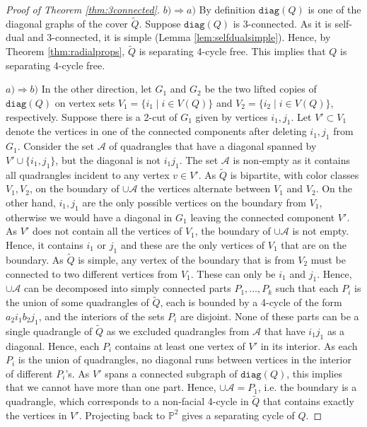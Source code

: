 \documentclass[10pt,a4paper]{article}
\newcommand{\Pb}[0]{\mathbb{P}}
\newcommand{\diag}[0]{\mathtt{diag}}
\begin{document}
\begin{proof}[Proof of Theorem \ref{thm:3connected}]
   $b)\Rightarrow a)$  By definition $\diag(Q)$ is one of the diagonal graphs of the cover $\widetilde Q$. Suppose $\diag(Q)$ is 3-connected. As it is self-dual and 3-connected, it is simple (Lemma \ref{lem:selfdualsimple}). Hence, by Theorem \ref{thm:radialprops}, $\widetilde{Q}$ is separating 4-cycle free. This implies that $Q$ is separating 4-cycle free. 



    $a)\Rightarrow b)$ In the other direction, let $G_1$ and $G_2$ be the two lifted copies of $\diag(Q)$ on vertex sets $V_1=\{i_1\mid i\in V(Q)\}$ and $V_2=\{i_2\mid i\in V(Q)\}$, respectively. Suppose there is a 2-cut of $G_1$ given by vertices $i_1,j_1$. Let $V'\subset V_1$ denote the vertices in one of the connected components after deleting $i_1,j_1$ from $G_1$. Consider the set $\mathcal A$ of quadrangles that have a diagonal spanned by $V'\cup\{i_1,j_1\}$, but the diagonal is not $i_1j_1$. The set $\mathcal{A}$ is non-empty as it contains all quadrangles incident to any vertex $v\in V'$. As $\widetilde Q$ is bipartite, with color classes $V_1,V_2$, on the boundary of $\cup \mathcal A$ the vertices alternate between $V_1$ and $V_2$. On the other hand, $i_1,j_1$ are the only possible vertices on the boundary from $V_1$, otherwise we would have a diagonal in $G_1$ leaving the connected component $V'$. As $V'$ does not contain all the vertices of $V_1$, the boundary of $\cup\mathcal A$ is not empty. Hence, it contains $i_1$ or $j_1$ and these are the only vertices of $V_1$ that are on the boundary. As $\widetilde Q$ is simple, any vertex of the boundary that is from $V_2$ must be connected to two different vertices from $V_1$. These can only be $i_1$ and $j_1$. Hence, $\cup \mathcal A$ can be decomposed into simply connected parts $P_1,\dots, P_k$ such that each $P_i$ is the union of some quadrangles of $\widetilde Q$, each is bounded by a 4-cycle of the form $a_2i_1b_2j_1$, and the interiors of the sets $P_i$ are disjoint. None of these parts can be a single quadrangle of $\widetilde Q$ as we excluded quadrangles from $\mathcal A$ that have $i_1j_1$ as a diagonal. Hence, each $P_i$ contains at least one vertex of $V'$ in its interior. As each $P_i$ is the union of quadrangles, no diagonal runs between vertices in the interior of different $P_i$'s. As $V'$ spans a connected subgraph of $\diag(Q)$, this implies that we cannot have more than one part. Hence, $\cup\mathcal A=P_1$, i.e. the boundary is a quadrangle, which corresponds to a non-facial 4-cycle in $\widetilde Q$ that contains exactly the vertices in $V'$. Projecting back to $\Pb^2$ gives a separating cycle of $Q$.


\end{proof}
\end{document}
